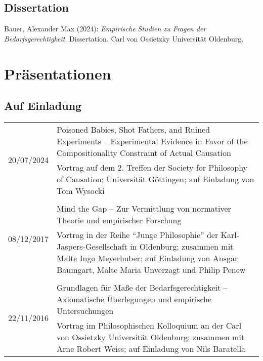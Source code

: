 \documentclass[a4paper,10pt]{article}
\newenvironment{literature}{%
   \parskip6pt\parindent0pt\raggedright
   \def\lititem{\hangindent=1cm\hangafter1}}{%
   \par\ignorespaces}
\begin{document}
\subsection*{Dissertation}
\begin{literature}
\lititem Bauer, Alexander Max (2024): \textit{Empirische Studien zu Fragen der Bedarfsgerechtigkeit}. Dissertation. Carl von Ossietzky Universität Oldenburg.
\end{literature}


\clearpage
\section{Präsentationen}
\subsection*{Auf Einladung}
\begin{longtable}{p{2cm}p{}}
\multirow{2}{2cm}{\footnotesize{20/07/2024}} & Poisoned Babies, Shot Fathers, and Ruined Experiments -- Experimental Evidence in Favor of the Compositionality Constraint of Actual Causation\\
& \footnotesize{Vortrag auf dem 2. Treffen der Society for Philosophy of Causation; Universität Göttingen; auf Einladung von Tom Wysocki}\\
\\
\multirow{2}{2cm}{\footnotesize{08/12/2017}} & Mind the Gap -- Zur Vermittlung von normativer Theorie und empirischer Forschung\\
& \footnotesize{Vortrag in der Reihe \enquote{Junge Philosophie} der Karl-Jaspers-Gesellschaft in Oldenburg; zusammen mit Malte Ingo Meyerhuber; auf Einladung von Ansgar Baumgart, Malte Maria Unverzagt und Philip Penew}\\
\\
\multirow{2}{2cm}{\footnotesize{22/11/2016}} & Grundlagen für Maße der Bedarfsgerechtigkeit -- Axiomatische Überlegungen und empirische Untersuchungen\\
& \footnotesize{Vortrag im Philosophischen Kolloquium an der Carl von Ossietzky Universität Oldenburg; zusammen mit Arne Robert Weiss; auf Einladung von Nils Baratella}\\
\end{longtable}
\end{document}
